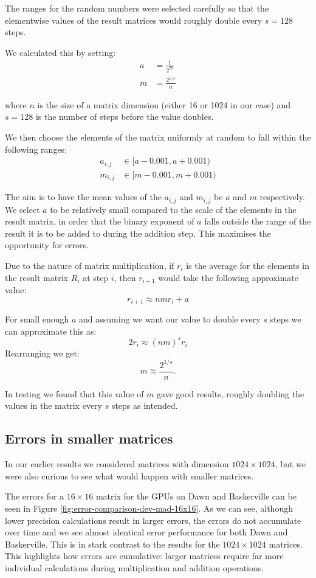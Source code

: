 The ranges for the random numbers were selected carefully so that the elementwise values of the result matrices would roughly double every $s = 128$ steps.

We calculated this by setting:
\begin{align*}
a &= \frac{1}{2^{20}} \\
m &= \frac{2^{1 / s}}{n}
\end{align*}

where $n$ is the size of a matrix dimension (either 16 or 1024 in our case) and $s = 128$ is the number of steps before the value doubles.

We then choose the elements of the matrix uniformly at random to fall within the following ranges:
\begin{align*}
a_{i, j} &\in [ a - 0.001, a + 0.001) \\
m_{i, j} &\in [ m - 0.001, m + 0.001)
\end{align*}

The aim is to have the mean values of the $a_{i, j}$ and $m_{i, j}$ be
$a$ and $m$ respectively. We select $a$ to be relatively small
compared to the scale of the elements in the result matrix, in order
that the binary exponent of $a$ falls outside the range of the result
it is to be added to during the addition step. This maximises the opportunity for errors.

Due to the nature of matrix multiplication, if $r_i$ is the average for the elements in the result matrix $R_i$ at step $i$, then $r_{i + 1}$ would take the following approximate value:
$$
r_{i + 1} \approx n m r_i + a
$$

For small enough $a$ and assuming we want our value to double every $s$ steps we can approximate this as:
$$
2 r_i \approx (n m)^s r_i
$$
Rearranging we get:
$$
m \approx \frac{2^{1 / s}}{n}.
$$

In testing we found that this value of $m$ gave good results, roughly doubling the values in the matrix every $s$ steps as intended.

\subsection{Errors in smaller matrices}

In our earlier results we considered matrices with dimension $1024 \times 1024$, but we were also curious to see what would happen with smaller matrices.

The errors for a $16 \times 16$ matrix for the GPUs on Dawn and Baskerville can be seen in Figure \ref{fig:error-comparison-dev-mad-16x16}. As we can see, although lower precision calculations result in larger errors, the errors do not accumulate over time and we see almost identical error performance for both Dawn and Baskerville. This is in stark contrast to the results for the $1024 \times 1024$ matrices. This highlights how errors are cumulative: larger matrices require far more individual calculations during multiplication and addition operations.

